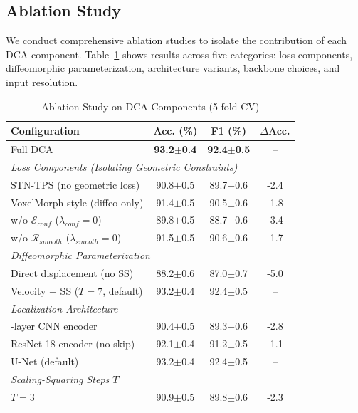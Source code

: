 \documentclass[10pt,journal,compsoc]{IEEEtran}
\begin{document}
\subsection{Ablation Study}

We conduct comprehensive ablation studies to isolate the contribution of each DCA component. Table~\ref{tab:ablation} shows results across five categories: loss components, diffeomorphic parameterization, architecture variants, backbone choices, and input resolution.

\begin{table}[t]
\centering
\caption{Ablation Study on DCA Components (5-fold CV)}
\label{tab:ablation}
\setlength{\tabcolsep}{4pt}
\begin{tabular}{lccc}
\hline
\textbf{Configuration} & \textbf{Acc. (\%)} & \textbf{F1 (\%)} & \textbf{$\Delta$Acc.} \\
\hline
Full DCA & \textbf{93.2$\pm$0.4} & \textbf{92.4$\pm$0.5} & -- \\
\hline
\multicolumn{4}{l}{\textit{Loss Components (Isolating Geometric Constraints)}} \\
\quad STN-TPS (no geometric loss) & 90.8$\pm$0.5 & 89.7$\pm$0.6 & -2.4 \\
\quad VoxelMorph-style (diffeo only) & 91.4$\pm$0.5 & 90.5$\pm$0.6 & -1.8 \\
\quad w/o $\mathcal{E}_{conf}$ ($\lambda_{conf}=0$) & 89.8$\pm$0.5 & 88.7$\pm$0.6 & -3.4 \\
\quad w/o $\mathcal{R}_{smooth}$ ($\lambda_{smooth}=0$) & 91.5$\pm$0.5 & 90.6$\pm$0.6 & -1.7 \\
\hline
\multicolumn{4}{l}{\textit{Diffeomorphic Parameterization}} \\
\quad Direct displacement (no SS) & 88.2$\pm$0.6 & 87.0$\pm$0.7 & -5.0 \\
\quad Velocity + SS ($T=7$, default) & 93.2$\pm$0.4 & 92.4$\pm$0.5 & -- \\
\hline
\multicolumn{4}{l}{\textit{Localization Architecture}} \\
\quad 3-layer CNN encoder & 90.4$\pm$0.5 & 89.3$\pm$0.6 & -2.8 \\
\quad ResNet-18 encoder (no skip) & 92.1$\pm$0.4 & 91.2$\pm$0.5 & -1.1 \\
\quad U-Net (default) & 93.2$\pm$0.4 & 92.4$\pm$0.5 & -- \\
\hline
\multicolumn{4}{l}{\textit{Scaling-Squaring Steps $T$}} \\
\quad $T=3$ & 90.9$\pm$0.5 & 89.8$\pm$0.6 & -2.3 \\

\end{tabular}
\end{table}
\end{document}
